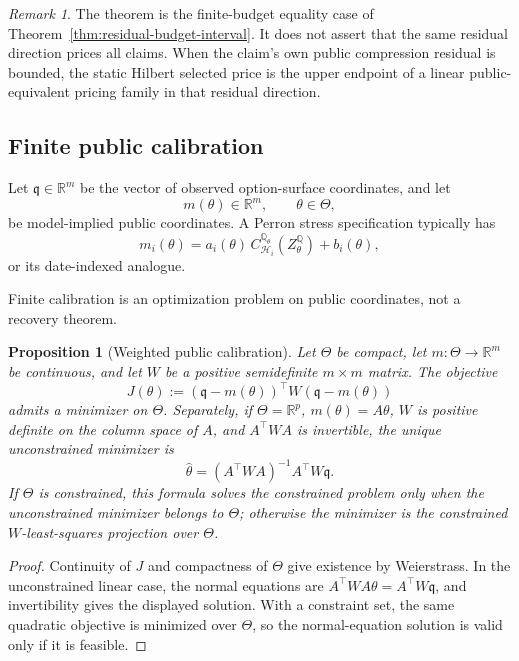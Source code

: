 \documentclass[11pt,a4paper]{amsart}
\theoremstyle{plain}
\newtheorem{proposition}[theorem]{Proposition}
\theoremstyle{definition}
\theoremstyle{remark}
\newtheorem{remark}[theorem]{Remark}
\newcommand{\R}{\mathbb{R}}
\newcommand{\QQ}{\mathbb{Q}}
\newcommand{\cH}{\mathcal{H}}
\begin{document}
\begin{remark}
The theorem is the finite-budget equality case of Theorem~\ref{thm:residual-budget-interval}.  It
does not assert that the same residual direction prices all claims.  When the claim's own public
compression residual is bounded, the static Hilbert selected price is the upper endpoint of a
linear public-equivalent pricing family in that residual direction.
\end{remark}

\subsection{Finite public calibration}

Let \(\mathfrak q\in\R^m\) be the vector of observed option-surface coordinates, and let
\[
        m(\theta)\in\R^m,\qquad \theta\in\Theta,
\]
be model-implied public coordinates.  A Perron stress specification typically has
\[
        m_i(\theta)
        =
        a_i(\theta)\,
        C_{\cH_i}^{\QQ_\theta}(Z^\QQ_\theta)
        +
        b_i(\theta),
\]
or its date-indexed analogue.

Finite calibration is an optimization problem on public coordinates, not a recovery theorem.

\begin{proposition}[Weighted public calibration]\label{prop:calibration}
Let \(\Theta\) be compact, let \(m:\Theta\to\R^m\) be continuous, and let \(W\) be a positive
semidefinite \(m\times m\) matrix.  The objective
\[
        J(\theta)
        :=
        (\mathfrak q-m(\theta))^\top W(\mathfrak q-m(\theta))
\]
admits a minimizer on \(\Theta\).  Separately, if \(\Theta=\R^p\), \(m(\theta)=A\theta\), \(W\) is
positive definite on the column space of \(A\), and \(A^\top W A\) is invertible, the unique
unconstrained minimizer is
\[
        \widehat\theta
        =
        (A^\top W A)^{-1}A^\top W \mathfrak q.
\]
If \(\Theta\) is constrained, this formula solves the constrained problem only when the
unconstrained minimizer belongs to \(\Theta\); otherwise the minimizer is the constrained
\(W\)-least-squares projection over \(\Theta\).
\end{proposition}

\begin{proof}
Continuity of \(J\) and compactness of \(\Theta\) give existence by Weierstrass.  In the
unconstrained linear case, the normal equations are
\(A^\top W A\theta=A^\top W\mathfrak q\), and invertibility gives the displayed solution.  With a
constraint set, the same quadratic objective is minimized over \(\Theta\), so the normal-equation
solution is valid only if it is feasible.
\end{proof}
\end{document}
